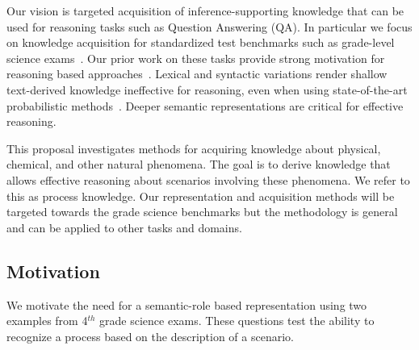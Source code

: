 Our vision is targeted acquisition of inference-supporting knowledge that can be used for reasoning tasks such as Question Answering (QA).
In particular we focus on knowledge acquisition for standardized test benchmarks such as grade-level science exams~\cite{clark2015elementary}.  Our prior work on these tasks provide strong motivation for reasoning based approaches~\cite{clark2014:akbc,chb2013:akbc}.
Lexical and syntactic variations render shallow text-derived knowledge ineffective for reasoning, even when using state-of-the-art probabilistic methods~\cite{khot2015:emlnlp}. 
Deeper semantic representations are critical for effective reasoning.

This proposal investigates methods for acquiring knowledge about physical, chemical, and other natural phenomena.
The goal is to derive knowledge that allows effective reasoning about scenarios involving these phenomena. We refer to this as process knowledge. 
Our representation and acquisition methods will be targeted towards the grade science benchmarks but the methodology is general and can be applied to other tasks and domains.

\subsection{Motivation}
We motivate the need for a semantic-role based representation using two examples from 4$^{th}$ grade science exams. These questions test the ability to recognize a process based on the description of a scenario. \\
\begin{center}
\\
\end{center}

